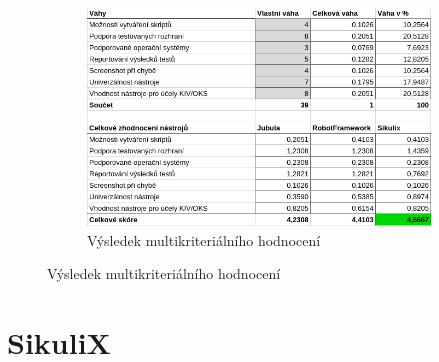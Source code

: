 \documentclass{bakalarka}
\begin{document}
\begin{figure}[ht]
	\ContinuedFloat
	\begin{subfigure}{\textwidth}
		\centering
		\caption{Výsledek multikriteriálního hodnocení}
		\includegraphics[width=14cm]{img/Kriteria/Kriteria3.png}
	\end{subfigure}
\end{figure}

\chapter{SikuliX}
\end{document}
